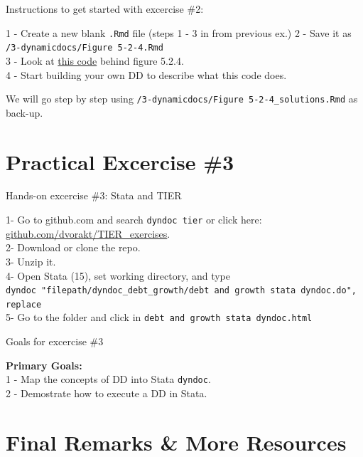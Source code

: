 \documentclass[ignorenonframetext,]{beamer}
\begin{document}
\begin{frame}[fragile]{Instructions to get started with excercise \#2:}

1 - Create a new blank \texttt{.Rmd} file (steps 1 - 3 in from previous
ex.) 2 - Save it as \texttt{/3-dynamicdocs/Figure\ 5-2-4.Rmd}\\
3 - Look at
\href{https://github.com/vikjam/mostly-harmless-replication/blob/master/05\%20Fixed\%20Effects\%2C\%20DD\%20and\%20Panel\%20Data/Figure\%205-2-4.r}{this
code} behind figure 5.2.4.\\
4 - Start building your own DD to describe what this code does.

We will go step by step using
\texttt{/3-dynamicdocs/Figure\ 5-2-4\_solutions.Rmd} as back-up.

\end{frame}

\section{Practical Excercise \#3}\label{practical-excercise-3}

\begin{frame}[fragile]{Hands-on excercise \#3: Stata and TIER}

1- Go to github.com and search \texttt{dyndoc\ tier} or click here:
\href{https://github.com/dvorakt/TIER_exercises}{github.com/dvorakt/TIER\_exercises}.\\
2- Download or clone the repo.\\
3- Unzip it.\\
4- Open Stata (15), set working directory, and type
\texttt{dyndoc\ "filepath/dyndoc\_debt\_growth/debt\ and\ growth\ stata\ dyndoc.do",\ replace}\\
5- Go to the folder and click in
\texttt{debt\ and\ growth\ stata\ dyndoc.html}

\end{frame}

\begin{frame}[fragile]{Goals for excercise \#3}

\textbf{Primary Goals:}\\
1 - Map the concepts of DD into Stata \texttt{dyndoc}.\\
2 - Demostrate how to execute a DD in Stata.

\end{frame}

\section{Final Remarks \& More
Resources}\label{final-remarks-more-resources}
\end{document}
